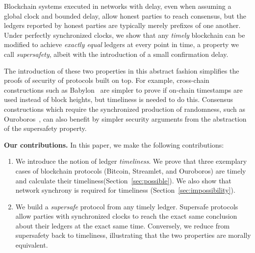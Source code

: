 Blockchain systems executed in networks with delay, even when assuming a global clock and
bounded delay, allow honest parties to reach consensus, but the ledgers reported by
honest parties are typically merely prefixes of one another.
Under perfectly synchronized clocks, we show that any \emph{timely} blockchain can be modified to achieve
\emph{exactly equal} ledgers at every point in time, a property we call \emph{supersafety},
albeit with the introduction of a small confirmation delay.

The introduction of these two
properties in this abstract fashion simplifies the proofs of security of protocols built on
top. For example, cross-chain constructions such as Babylon~\cite{babylon} are simpler
to prove if on-chain timestamps are used instead of block heights,
but timeliness is needed to do this.
Consensus constructions which require the synchronized production of randomness,
such as Ouroboros~\cite{ouroboros,praos}, can also benefit by simpler security
arguments from the abstraction of the supersafety property.

\noindent
\textbf{Our contributions.} In this paper, we make the following contributions:

\begin{enumerate}
  \item We introduce the notion of ledger \emph{timeliness}.
        We prove that three exemplary cases of blockchain protocols (Bitcoin, Streamlet, and Ouroboros)
        are timely and calculate their timeliness(Section~\ref{sec:possible}). We also show that network synchrony is required for timeliness (Section~\ref{sec:impossibility}).
  \item We build a \emph{supersafe} protocol from any timely ledger.
        Supersafe protocols allow parties with synchronized clocks to
        reach the exact same conclusion about their ledgers at the exact same time.
        Conversely, we reduce from supersafety back to timeliness, illustrating that
        the two properties are morally equivalent.
\end{enumerate}

